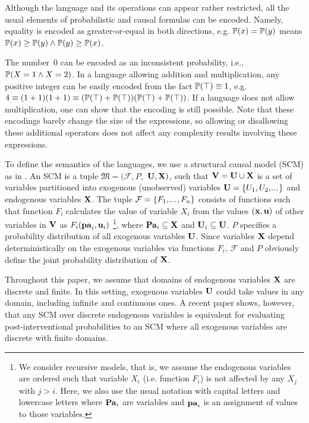 \documentclass[a4paper,UKenglish,cleveref, autoref, thm-restate]{lipics-v2021}
\newcommand{\compactEquals}[1]{\let\IsInPP=1#1\let\IsInPP=\relax}
\newcommand{\PP}[1]{\mathbb{P}(\compactEquals{#1})}
\newcommand{\cF}{{\mathcal F}}
\newcommand{\fM}{{\mathfrak M}}
\newcommand{\bU}{{\bf U}}
\newcommand{\bV}{{\bf V}}
\newcommand{\bX}{{\bf X}}
\newcommand{\bu}{{\bf u}}
\newcommand{\bx}{{\bf x}}
\newcommand{\pa}{{\bf pa}}
\newcommand{\Pa}{{\bf Pa}}
\newcommand\myldots{\!\makebox[1em][c]{.\hfil.\hfil.}}
\begin{document}
Although the language and its operations can appear rather restricted, all the usual elements of probabilistic and causal formulas can be encoded. Namely, equality is encoded as greater-or-equal in both directions, e.g. 
$\PP{x} = \PP{y}$ means $\PP{x} \geq \PP{y} \wedge \PP{y} \geq \PP{x}$.

The number~$0$ can be encoded as an inconsistent probability, 
i.e., $\PP{X=1 \wedge X=2}$. 
In a language allowing addition and multiplication, any positive integer can be easily encoded
from the fact $\PP{\top} \equiv 1$, e.g. $4 \equiv (1 + 1) (1 + 1) \equiv (\PP{\top} + \PP{\top}) (\PP{\top} + \PP{\top})$.
If a language does not allow multiplication, one can show that the encoding is still possible.
Note that these encodings barely change the size of the expressions, so allowing or disallowing these additional operators does not affect any complexity results involving these expressions. 




To define the semantics of the languages,  we use  a structural causal model (SCM) as in \cite[Sec.~3.2]{Pearl2009}.
An SCM 
is a tuple $\fM=(\cF, P, $ $\bU, \bX)$, such that $\bV = \bU \cup \bX$ is a set of 
variables partitioned into 
exogenous (unobserved) variables $\bU=\{U_1,U_2,\myldots \}$ and 
endogenous variables $\bX$.
The tuple $\cF=\{F_1,\myldots,F_n\}$ consists of
functions such that function $F_i$ calculates the value of variable $X_i$ from the values 
$(\bx, \bu)$ of other variables in $\bV$ as  
$F_i(\pa_i,\bu_i)$ \footnote{We consider recursive models, 
that is, we assume the endogenous variables 
are ordered such that variable $X_i$ (i.e. function $F_i$) is not affected by any 
 $X_j$ with $j > i$. 
Here, we also use the usual notation with capital letters and lowercase letters where  $\Pa_i$  are variables and $\pa_i$ is an assignment of values to those variables.},
 where $\Pa_i\subseteq \bX$ and $\bU_i\subseteq \bU$. 
$P$ specifies a probability distribution 
of all exogenous  variables $\bU$. Since variables $\bX$  depend deterministically on 
 the exogenous variables via functions $F_i$,
 $\cF$ and $P$ obviously define 
the joint probability distribution of 
$\bX$.
 
 Throughout this paper, we assume that domains of endogenous variables $\bX$ are 
 discrete and finite. In this setting, exogenous variables $\bU$ could take values 
 in any  domain, including infinite and continuous ones.
 A recent paper \citep{zhang2022partial} shows, however,
 that any SCM over discrete endogenous variables is equivalent 
 for evaluating post-interventional probabilities to an SCM where all exogenous variables are discrete with finite
 domains.
\end{document}
